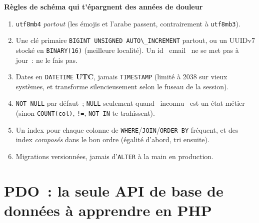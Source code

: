 \documentclass[12pt,a4paper,twoside,openright]{book}
\newcommand{\etape}[1]{\par\medskip\noindent\textbf{\large #1}\par\smallskip}
\begin{document}
\etape{R\`egles de sch\'ema qui t'\'epargnent des ann\'ees de douleur}
\begin{enumerate}
  \item \verb|utf8mb4| \emph{partout} (les \'emojis et l'arabe passent, contrairement \`a \verb|utf8mb3|).
  \item Une cl\'e primaire \verb|BIGINT UNSIGNED AUTO\_INCREMENT| partout, ou un UUIDv7 stock\'e en
        \verb|BINARY(16)| (meilleure localit\'e). Un id \og ~email~ \fg{} ne se met pas \`a jour~: ne le fais pas.
  \item Dates en \verb|DATETIME| \textbf{UTC}, jamais \verb|TIMESTAMP| (limit\'e \`a 2038 sur vieux syst\`emes,
        et transforme silencieusement selon le fuseau de la session).
  \item \verb|NOT NULL| par d\'efaut~; \verb|NULL| seulement quand \og ~inconnu~ \fg{} est un \'etat m\'etier
        (sinon \verb|COUNT(col)|, \verb|!=|, \verb|NOT IN| te trahissent).
  \item Un index pour chaque colonne de \verb|WHERE|/\verb|JOIN|/\verb|ORDER BY| fr\'equent, et des
        index \emph{compos\'es} dans le bon ordre (\'egalit\'e d'abord, tri ensuite).
  \item Migrations versionn\'ees, jamais d'\verb|ALTER| \`a la main en production.
\end{enumerate}

\section{PDO~: la seule API de base de donn\'ees \`a apprendre en PHP}
\end{document}
